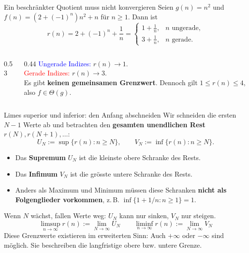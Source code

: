 \begin{frame}{Ein beschränkter Quotient muss nicht konvergieren}
	Seien $g(n)=n^2$ und $f(n)=(2+(-1)^n)n^2+n$ für $n\geq 1$. Dann ist
	\[
		r(n)=2+(-1)^n+\frac{1}{n}
		=\begin{cases}1+\frac{1}{n},&n\text{ ungerade},\\3+\frac{1}{n},&n\text{ gerade}.\end{cases}
	\]
	\begin{columns}[c]
		\begin{column}{0.53\textwidth}
			\centering
		\end{column}
		\begin{column}{0.44\textwidth}
			\small
			\textcolor{Blue}{Ungerade Indizes:} $r(n)\to 1$.\\[0.4em]
			\textcolor{Red}{Gerade Indizes:} $r(n)\to 3$.\\[0.6em]
			Es gibt \textbf{keinen gemeinsamen Grenzwert}. Dennoch gilt $1\leq r(n)\leq 4$, also $f\in\Theta(g)$.
		\end{column}
	\end{columns}
\end{frame}

\begin{frame}{Limes superior und inferior: den Anfang abschneiden}
	Wir schneiden die ersten $N-1$ Werte ab und betrachten den \textbf{gesamten unendlichen Rest} $r(N),r(N+1),\ldots$:
	\[
		U_N:=\sup\{r(n):n\geq N\},\qquad
		V_N:=\inf\{r(n):n\geq N\}.
	\]
	\begin{itemize}
		\item Das \textbf{Supremum} $U_N$ ist die kleinste obere Schranke des Rests.
		\item Das \textbf{Infimum} $V_N$ ist die grösste untere Schranke des Rests.
		\item Anders als Maximum und Minimum müssen diese Schranken \textbf{nicht als Folgenglieder vorkommen}, z.\,B. $\inf\{1+1/n:n\geq 1\}=1$.
	\end{itemize}
	\pause
	Wenn $N$ wächst, fallen Werte weg: $U_N$ kann nur sinken, $V_N$ nur steigen.
	\[
		\boxed{\limsup_{n\to\infty}r(n):=\lim_{N\to\infty}U_N}\qquad
		\boxed{\liminf_{n\to\infty}r(n):=\lim_{N\to\infty}V_N}
	\]
	\small Diese Grenzwerte existieren im erweiterten Sinn: Auch $+\infty$ oder $-\infty$ sind möglich. Sie beschreiben die langfristige obere bzw. untere Grenze.
\end{frame}

